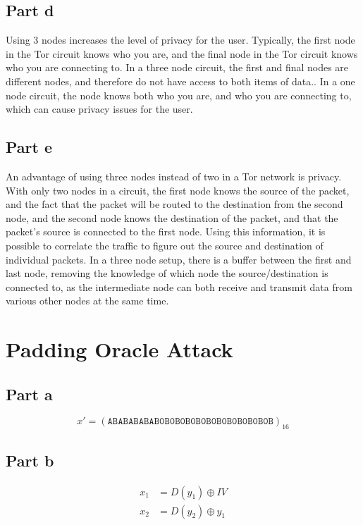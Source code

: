 \documentclass[12pt,a4paper]{article}
\begin{document}
\subsection{Part d}
Using 3 nodes increases the level of privacy for the user. Typically, the first node in the Tor circuit knows who you are, and the final node in the Tor circuit knows who you are connecting to. In a three node circuit, the first and final nodes are different nodes, and therefore do not have access to both items of data.. In a one node circuit, the node knows both who you are, and who you are connecting to, which can cause privacy issues for the user.

\subsection{Part e}
An advantage of using three nodes instead of two in a Tor network is privacy. With only two nodes in a circuit, the first node knows the source of the packet, and the fact that the packet will be routed to the destination from the second node, and the second node knows the destination of the packet, and that the packet's source is connected to the first node. Using this information, it is possible to correlate the traffic to figure out the source and destination of individual packets. In a three node setup, there is a buffer between the first and last node, removing the knowledge of which node the source/destination is connected to, as the intermediate node can both receive and transmit data from various other nodes at the same time.

\section{Padding Oracle Attack}
\subsection{Part a}
\[
  x' = (\mathtt{ABABABABAB0B0B0B0B0B0B0B0B0B0B0B})_{16}
\]

\subsection{Part b}
\begin{align*}
  x_1 &= D(y_1) \oplus IV \\
  x_2 &= D(y_2) \oplus y_1
\end{align*}
\end{document}
